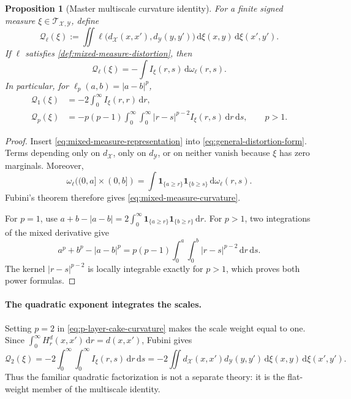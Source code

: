 \documentclass[11pt,a4paper]{article}
\newtheorem{proposition}[theorem]{Proposition}
\theoremstyle{definition}
\theoremstyle{remark}
\newcommand{\Tcal}{\mathcal T}
\newcommand{\Qcal}{\mathcal Q}
\newcommand{\dd}{\,\mathrm d}
\newcommand{\abs}[1]{\left\lvert #1\right\rvert}
\begin{document}
\begin{proposition}[Master multiscale curvature identity]
\label{prop:master-multiscale}
For a finite signed measure
\(\xi\in\Tcal_{\mathcal X,\mathcal Y}\), define
\begin{equation}
  \Qcal_\ell(\xi)
  :=\iint
  \ell\bigl(d_{\mathcal X}(x,x'),d_{\mathcal Y}(y,y')\bigr)
  \dd\xi(x,y)\dd\xi(x',y').
  \label{eq:general-distortion-form}
\end{equation}
If \(\ell\) satisfies \cref{def:mixed-measure-distortion}, then
\begin{equation}
  \Qcal_\ell(\xi)
  =-\int I_\xi(r,s)\dd\omega_\ell(r,s).
  \label{eq:mixed-measure-curvature}
\end{equation}
In particular, for \(\ell_p(a,b)=\abs{a-b}^p\),
\begin{align}
  \Qcal_1(\xi)
  &=-2\int_0^\infty I_\xi(r,r)\dd r,
  \label{eq:p1-layer-cake}\\
  \Qcal_p(\xi)
  &=-p(p-1)\int_0^\infty\int_0^\infty
  \abs{r-s}^{p-2}I_\xi(r,s)\dd r\dd s,
  \qquad p>1.
  \label{eq:p-layer-cake-curvature}
\end{align}
\end{proposition}

\begin{proof}
Insert \eqref{eq:mixed-measure-representation} into
\eqref{eq:general-distortion-form}.  Terms depending only on
\(d_{\mathcal X}\), only on \(d_{\mathcal Y}\), or on neither vanish because
\(\xi\) has zero marginals.  Moreover,
\[
  \omega_\ell((0,a]\times(0,b])
  =\int\mathbf 1_{\{a\geq r\}}\mathbf 1_{\{b\geq s\}}
  \dd\omega_\ell(r,s).
\]
Fubini's theorem therefore gives \eqref{eq:mixed-measure-curvature}.

For \(p=1\), use
\(a+b-\abs{a-b}=2\int_0^\infty
\mathbf 1_{\{a\geq r\}}\mathbf 1_{\{b\geq r\}}\dd r\).
For \(p>1\), two integrations of the mixed derivative give
\[
  a^p+b^p-\abs{a-b}^p
  =p(p-1)\int_0^a\int_0^b\abs{r-s}^{p-2}\dd r\dd s.
\]
The kernel \(\abs{r-s}^{p-2}\) is locally integrable exactly for \(p>1\),
which proves both power formulas.
\end{proof}

\paragraph{The quadratic exponent integrates the scales.}
Setting \(p=2\) in \eqref{eq:p-layer-cake-curvature} makes the scale weight
equal to one.  Since
\(\int_0^\infty H_r^d(x,x')\dd r=d(x,x')\), Fubini gives
\begin{equation}
  \Qcal_2(\xi)
  =-2\int_0^\infty\int_0^\infty I_\xi(r,s)\dd r\dd s
  =-2\iint
  d_{\mathcal X}(x,x')d_{\mathcal Y}(y,y')
  \dd\xi(x,y)\dd\xi(x',y').
  \label{eq:p2-factorization}
\end{equation}
Thus the familiar quadratic factorization is not a separate theory: it is the
flat-weight member of the multiscale identity.
\end{document}
